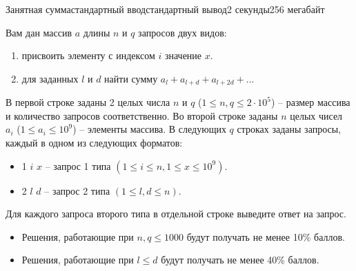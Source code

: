\begin{problem}{Занятная сумма}{стандартный ввод}{стандартный вывод}{2 секунды}{256 мегабайт}

Вам дан массив $a$ длины $n$ и $q$ запросов двух видов:
\begin{enumerate}
\item присвоить элементу с индексом $i$ значение $x$.
\item для заданных $l$ и $d$ найти сумму $a_l + a_{l + d} + a_{l + 2d} + ...$
\end{enumerate}


\InputFile
В первой строке заданы 2 целых числа $n$ и $q$ ($1 \le n,q \le 2 \cdot 10^5$) -- размер массива и количество запросов соответственно. 
Во второй строке заданы $n$ целых чисел $a_i$ ($1 \le a_i \le 10^9$) -- элементы массива.
В следующих $q$ строках заданы запросы, каждый в одном из следующих форматов:
\begin{itemize}
\item 1 $i$ $x$ -- запрос 1 типа $(1 \le i \le n, 1 \le x \le 10^9)$.
\item 2 $l$ $d$ -- запрос 2 типа $(1 \le l, d \le n)$.~~
\end{itemize}

\OutputFile
Для каждого запроса второго типа в отдельной строке выведите ответ на запрос.

\Scoring
\begin{itemize}
\item Решения, работающие при $n, q \le 1000$ будут получать не менее 10\% баллов.
\item Решения, работающие при $l \le d$ будут получать не менее 40\% баллов.
\end{itemize}

\Example

\begin{example}
%
\end{example}

\end{problem}

